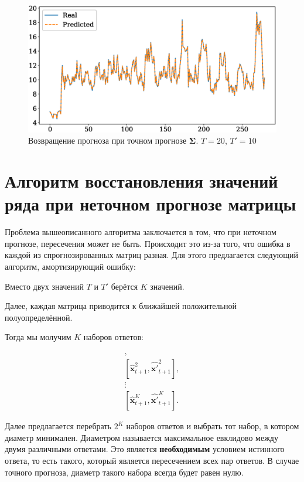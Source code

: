 \documentclass{article}
\begin{document}
\begin{figure}[H]
	\centering
	\includegraphics[width=\textwidth]{IdealRecovery.eps}
	\caption{Возвращение прогноза при точном прогнозе $\mathbf{\Sigma}$. $T=20$, $T'=10$}
	\label{fig:fig3}
\end{figure}

\section{Алгоритм восстановления значений ряда при неточном прогнозе матрицы}

Проблема вышеописанного алгоритма заключается в том, что при неточном прогнозе, пересечения может не быть. Происходит это из-за того, что ошибка в каждой из спрогнозированных матриц разная. Для этого предлагается следующий алгоритм, амортизирующий ошибку:

Вместо двух значений  $T$ и $T'$ берётся $K$ значений.

Далее, каждая матрица приводится к ближайшей положительной полуопределённой.

Тогда мы молучим $K$ наборов ответов:

\begin{gather*}
	[\hat{\mathbf{x}}_{t+1}^1, \hat{\mathbf{x}'}_{t+1}^1],\\
	[\hat{\mathbf{x}}_{t+1}^2, \hat{\mathbf{x}'}_{t+1}^2],\\
	\vdots \\
	[\hat{\mathbf{x}}_{t+1}^K, \hat{\mathbf{x}'}_{t+1}^K].
\end{gather*}

Далее предлагается перебрать $2^K$ наборов ответов и выбрать тот набор, в котором диаметр минимален. Диаметром называется максимальное евклидово между двумя различными ответами. Это является \textbf{необходимым} условием истинного ответа, то есть такого, который является пересечением всех пар ответов. В случае точного прогноза, диаметр такого набора всегда будет равен нулю.
\end{document}
